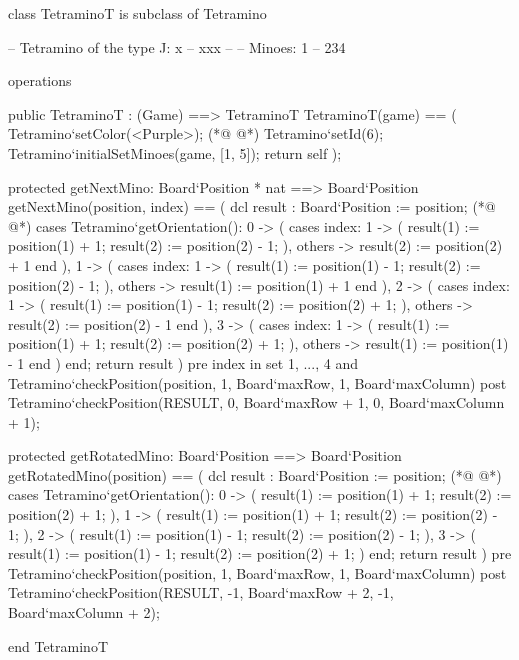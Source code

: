 \begin{vdmpp}[breaklines=true]
class TetraminoT is subclass of Tetramino
  
 -- Tetramino of the type J:  x
 --       xxx
 --
 -- Minoes:        1
 --         234
 

 operations
 
  public TetraminoT : (Game) ==> TetraminoT
  TetraminoT(game) == (
   Tetramino`setColor(<Purple>);
(*@
\label{TetraminoT:15}
@*)
   Tetramino`setId(6);
   Tetramino`initialSetMinoes(game, [1, 5]);
   return self
  );

  protected getNextMino: Board`Position * nat ==> Board`Position
  getNextMino(position, index) == (
   dcl result : Board`Position := position;
(*@
\label{getNextMino:23}
@*)
   cases Tetramino`getOrientation():
    0 -> (
     cases index:
      1 -> (
       result(1) := position(1) + 1;
       result(2) := position(2) - 1;
      ),
      others -> result(2) := position(2) + 1
     end
    ),
    1 -> (
     cases index:
      1 -> (
       result(1) := position(1) - 1;
       result(2) := position(2) - 1;
      ),
      others -> result(1) := position(1) + 1
     end
    ),
    2 -> (
     cases index:
      1 -> (
       result(1) := position(1) - 1;
       result(2) := position(2) + 1;
      ),
      others -> result(2) := position(2) - 1
     end
    ),
    3 -> (
     cases index:
      1 -> (
       result(1) := position(1) + 1;
       result(2) := position(2) + 1;
      ),
      others -> result(1) := position(1) - 1
     end
    )
   end;
   return result
  )
  pre index in set {1, ..., 4} 
   and Tetramino`checkPosition(position, 1, Board`maxRow, 1, Board`maxColumn)
  post Tetramino`checkPosition(RESULT, 0, Board`maxRow + 1, 0, Board`maxColumn + 1);
  
  protected getRotatedMino: Board`Position ==> Board`Position
  getRotatedMino(position) == (
   dcl result : Board`Position := position;
(*@
\label{getRotatedMino:70}
@*)
   cases Tetramino`getOrientation():
    0 -> (
     result(1) := position(1) + 1; 
     result(2) := position(2) + 1;
     ),
    1 -> (
     result(1) := position(1) + 1; 
     result(2) := position(2) - 1;
     ),
    2 -> (
     result(1) := position(1) - 1; 
     result(2) := position(2) - 1;
     ),
    3 -> (
     result(1) := position(1) - 1; 
     result(2) := position(2) + 1;
     )
   end;
   return result
  )
  pre Tetramino`checkPosition(position, 1, Board`maxRow, 1, Board`maxColumn)
  post Tetramino`checkPosition(RESULT, -1, Board`maxRow + 2, -1, Board`maxColumn + 2);

end TetraminoT
\end{vdmpp}

